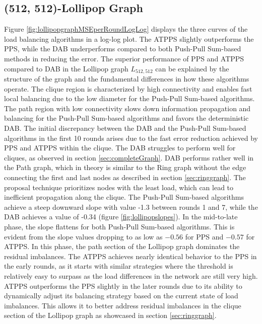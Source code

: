 \subsection{(512, 512)-Lollipop Graph}
Figure \ref{fig:lollipopgraphMSEperRoundLogLog} displays the three curves of the load balancing algorithms in a log-log plot. The ATPPS slightly outperforms the PPS, while the DAB underperforms compared to both Push-Pull Sum-based methods in reducing the error. The superior performance of PPS and ATPPS compared to DAB in the Lollipop graph $L_{512,512}$ can be explained by the structure of the graph and the fundamental differences in how these algorithms operate. The clique region is characterized by high connectivity and enables fast local balancing due to the low diameter for the Push-Pull Sum-based algorithms. The path region with low connectivity slows down information propagation and balancing for the Push-Pull Sum-based algorithms and favors the deterministic DAB. The initial discrepancy between the DAB and the Push-Pull Sum-based algorithms in the first 10 rounds arises due to the fast error reduction achieved by PPS and ATPPS within the clique. The DAB struggles to perform well for cliques, as observed in section \ref{sec:completeGraph}. DAB performs rather well in the Path graph, which in theory is similar to the Ring graph without the edge connecting the first and last nodes as described in section \ref{sec:ringgraph}. The proposal technique prioritizes nodes with the least load, which can lead to inefficient propagation along the clique. The Push-Pull Sum-based algorithms achieve a steep downward slope with value -1.3 between rounds 1 and 7, while the DAB achieves a value of -0.34 (figure \ref{fig:lollipopslopes}). In the mid-to-late phase, the slope flattens for both Push-Pull Sum-based algorithms. This is evident from the slope values dropping to as low as $-0.56$ for PPS and $-0.57$ for ATPPS. In this phase, the path section of the Lollipop graph dominates the residual imbalances. The ATPPS achieves nearly identical behavior to the PPS in the early rounds, as it starts with similar strategies where the threshold is relatively easy to surpass as the load differences in the network are still very high. ATPPS outperforms the PPS slightly in the later rounds due to its ability to dynamically adjust its balancing strategy based on the current state of load imbalances. This allows it to better address residual imbalances in the clique section of the Lollipop graph as showcased in section \ref{sec:ringgraph}.

